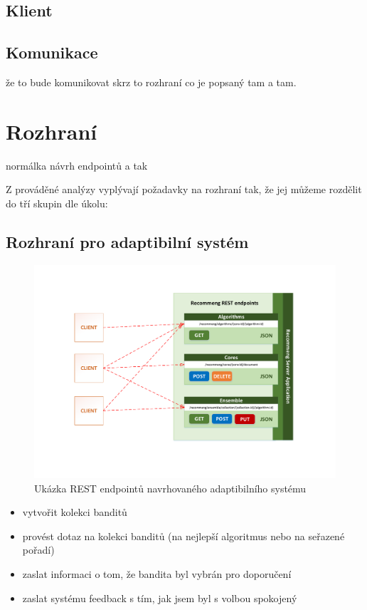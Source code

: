 \documentclass[thesis=M,czech]{FITthesis}[2014/05/07]
\begin{document}
\subsection{Klient}

\subsection{Komunikace}

že to bude komunikovat skrz to rozhraní co je popsaný tam a tam. 

\section{Rozhraní}

normálka návrh endpointů a tak

Z prováděné analýzy vyplývají požadavky na rozhraní tak, že jej můžeme rozdělit do tří skupin dle úkolu:

\subsection{Rozhraní pro adaptibilní systém}

\begin{figure}\centering
	\includegraphics[width=1.0\textwidth]{obr/DIPLOMKA_rest.pdf}
 	\caption[Ukázka REST endpointů navrhovaného adaptibilního systému]{Ukázka REST endpointů navrhovaného adaptibilního systému}\label{fig:longtail}
\end{figure}	

\begin{itemize}
	\item vytvořit kolekci banditů
	\item 	provést dotaz na kolekci banditů (na nejlepší algoritmus nebo na seřazené pořadí)
	\item 	zaslat informaci o tom, že bandita byl vybrán pro doporučení
	\item zaslat systému feedback s tím, jak jsem byl s volbou spokojený		
\end{itemize}
\end{document}
